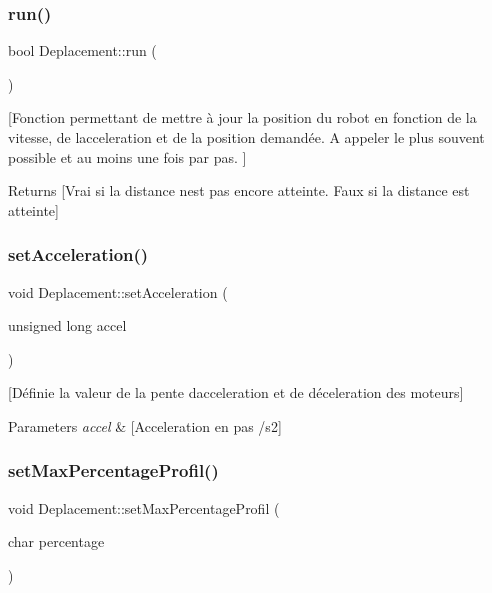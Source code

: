 \subsubsection{run()}
{\footnotesize\ttfamily bool Deplacement\+::run (\begin{DoxyParamCaption}{ }\end{DoxyParamCaption})}

[Fonction permettant de mettre à jour la position du robot en fonction de la vitesse, de l\textquotesingle{}acceleration et de la position demandée. A appeler le plus souvent possible et au moins une fois par pas. ] \begin{DoxyReturn}{Returns}
[Vrai si la distance n\textquotesingle{}est pas encore atteinte. Faux si la distance est atteinte] 
\end{DoxyReturn}
\label{class_deplacement_a32473a1c0f69aee2d3c697f64e54be82} 
\subsubsection{set\+Acceleration()}
{\footnotesize\ttfamily void Deplacement\+::set\+Acceleration (\begin{DoxyParamCaption}\item[{unsigned long}]{accel }\end{DoxyParamCaption})}

[Définie la valeur de la pente d\textquotesingle{}acceleration et de déceleration des moteurs] 
\begin{DoxyParams}{Parameters}
{\em accel} & [Acceleration en pas /s2] \\
\hline
\end{DoxyParams}
\label{class_deplacement_ae667960cbffb0252eca02bd718130d83} 
\subsubsection{set\+Max\+Percentage\+Profil()}
{\footnotesize\ttfamily void Deplacement\+::set\+Max\+Percentage\+Profil (\begin{DoxyParamCaption}\item[{char}]{percentage }\end{DoxyParamCaption})}

